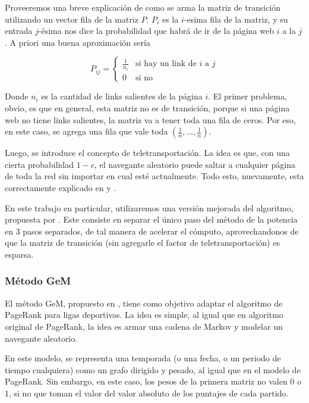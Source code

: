 Proveeremos una breve explicación de como se arma la matriz de transición utilizando un vector fila de la matriz $P$. 
$P_i$ es la $i$-esima fila de la matriz, y su entrada $j$-ésima nos dice la probabilidad que habrá de ir de la página web $i$ a la $j$. A priori una buena aproximación sería

\[ P_{ij} = \begin{cases} 
      \frac{1}{n_i} & \text{si hay un link de $i$ a $j$} \\
       0 & \text{si no}
   \end{cases}
\] 

Donde $n_i$ es la cantidad de links salientes de la página $i$.
El primer problema, obvio, es que en general, esta matriz no es de transición, porque si una página web no tiene links salientes, la matriz va a tener toda una fila de ceros. Por eso, en este caso, se agrega una fila que vale toda $(\frac1n, ..., \frac1n)$.

Luego, se introduce el concepto de teletransportación. La idea es que, con una cierta probabilidad $1-c$, el navegante aleatorio puede saltar a cualquier página de toda la red sin importar en cual esté actualmente. Todo esto, nuevamente, esta correctamente explicado en \cite{Brin1998} y \cite{Kamvar2003}.

En este trabajo en particular, utilizaremos una versión mejorada del algoritmo, propuesta por \cite{Kamvar2003}. Este consiste en separar el único paso del método de la potencia en 3 pasos separados, de tal manera de acelerar el cómputo, aprovechandonos de que la matriz de transición (sin agregarle el factor de teletransportación) es esparsa.

\subsubsection{Método GeM}

El método GeM, propuesto en \cite{Govan2008}, tiene como objetivo adaptar el algoritmo de PageRank para ligas deportivas. La idea es simple, al igual que en algoritmo original de PageRank, la idea es armar una cadena de Markov y modelar un navegante aleatorio.

En este modelo, se representa una temporada (o una fecha, o un periodo de tiempo cualquiera) como un grafo dirigido y pesado, al igual que en el modelo de PageRank. Sin embargo, en este caso, los pesos de la primera matriz no valen 0 o 1, si no que toman el valor del valor absoluto de los puntajes de cada partido.

